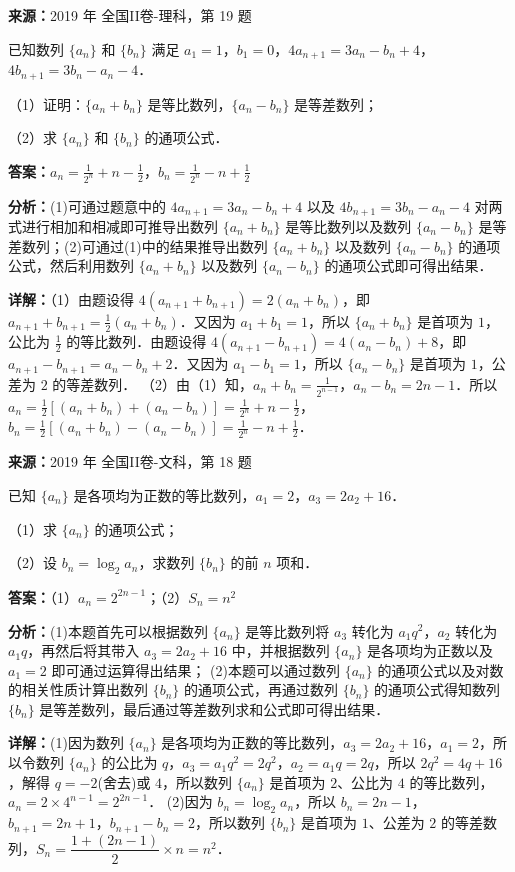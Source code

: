 \begin{question}[points=12]
\textbf{来源：}2019 年 全国II卷-理科，第 19 题\par
已知数列 $\{a_n\}$ 和 $\{b_n\}$ 满足 $a_1=1$，$b_1=0$，$4a_{n+1}=3a_n-b_n+4$，$4b_{n+1}=3b_n-a_n-4$．

（1）证明：$\{a_n+b_n\}$ 是等比数列，$\{a_n-b_n\}$ 是等差数列；

（2）求 $\{a_n\}$ 和 $\{b_n\}$ 的通项公式．
\begin{solution}
\textbf{答案：}$a_n=\frac{1}{2^n}+n-\frac{1}{2}$，$b_n=\frac{1}{2^n}-n+\frac{1}{2}$

\textbf{分析：}(1)可通过题意中的 $4a_{n+1}=3a_n-b_n+4$ 以及 $4b_{n+1}=3b_n-a_n-4$ 对两式进行相加和相减即可推导出数列 $\{a_n+b_n\}$ 是等比数列以及数列 $\{a_n-b_n\}$ 是等差数列；(2)可通过(1)中的结果推导出数列 $\{a_n+b_n\}$ 以及数列 $\{a_n-b_n\}$ 的通项公式，然后利用数列 $\{a_n+b_n\}$ 以及数列 $\{a_n-b_n\}$ 的通项公式即可得出结果．

\textbf{详解：}（1）由题设得 $4(a_{n+1}+b_{n+1})=2(a_n+b_n)$，即 $a_{n+1}+b_{n+1}=\frac{1}{2}(a_n+b_n)$．又因为 $a_1+b_1=1$，所以 $\{a_n+b_n\}$ 是首项为 $1$，公比为 $\frac{1}{2}$ 的等比数列．由题设得 $4(a_{n+1}-b_{n+1})=4(a_n-b_n)+8$，即 $a_{n+1}-b_{n+1}=a_n-b_n+2$．又因为 $a_1-b_1=1$，所以 $\{a_n-b_n\}$ 是首项为 $1$，公差为 $2$ 的等差数列．
（2）由（1）知，$a_n+b_n=\frac{1}{2^{n-1}}$，$a_n-b_n=2n-1$．所以 $a_n=\frac{1}{2}[(a_n+b_n)+(a_n-b_n)]=\frac{1}{2^n}+n-\frac{1}{2}$，$b_n=\frac{1}{2}[(a_n+b_n)-(a_n-b_n)]=\frac{1}{2^n}-n+\frac{1}{2}$．
\end{solution}
\end{question}

\begin{question}[points=12]
\textbf{来源：}2019 年 全国II卷-文科，第 18 题\par
已知 $\{a_n\}$ 是各项均为正数的等比数列，$a_1=2$，$a_3=2a_2+16$．

（1）求 $\{a_n\}$ 的通项公式；

（2）设 $b_n=\log_2 a_n$，求数列 $\{b_n\}$ 的前 $n$ 项和．
\begin{solution}
\textbf{答案：}（1）$a_n=2^{2n-1}$；（2）$S_n=n^2$

\textbf{分析：}(1)本题首先可以根据数列 $\{a_n\}$ 是等比数列将 $a_3$ 转化为 $a_1q^2$，$a_2$ 转化为 $a_1q$，再然后将其带入 $a_3=2a_2+16$ 中，并根据数列 $\{a_n\}$ 是各项均为正数以及 $a_1=2$ 即可通过运算得出结果；
(2)本题可以通过数列 $\{a_n\}$ 的通项公式以及对数的相关性质计算出数列 $\{b_n\}$ 的通项公式，再通过数列 $\{b_n\}$ 的通项公式得知数列 $\{b_n\}$ 是等差数列，最后通过等差数列求和公式即可得出结果．

\textbf{详解：}(1)因为数列 $\{a_n\}$ 是各项均为正数的等比数列，$a_3=2a_2+16$，$a_1=2$，所以令数列 $\{a_n\}$ 的公比为 $q$，$a_3=a_1q^2=2q^2$，$a_2=a_1q=2q$，所以 $2q^2=4q+16$，解得 $q=-2$(舍去)或 $4$，所以数列 $\{a_n\}$ 是首项为 $2$、公比为 $4$ 的等比数列，$a_n=2\times4^{n-1}=2^{2n-1}$．
(2)因为 $b_n=\log_2 a_n$，所以 $b_n=2n-1$，$b_{n+1}=2n+1$，$b_{n+1}-b_n=2$，所以数列 $\{b_n\}$ 是首项为 $1$、公差为 $2$ 的等差数列，$S_n=\dfrac{1+(2n-1)}{2}\times n=n^2$．
\end{solution}
\end{question}

